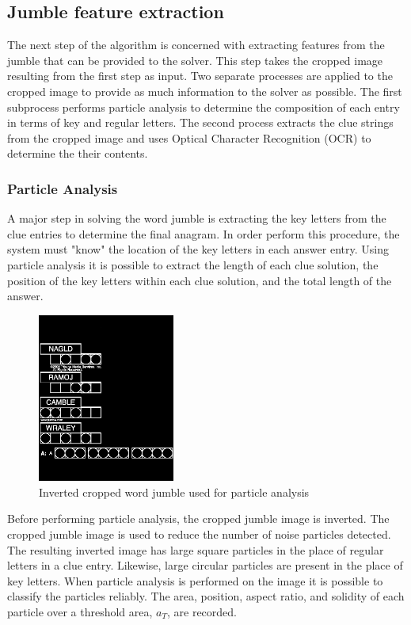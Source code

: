 \documentclass{article}
\begin{document}
	\subsection{Jumble feature extraction}
	The next step of the algorithm is concerned with extracting features from the jumble that can be provided to the solver.  This step takes the cropped image resulting from the first step as input.   Two separate processes are applied to the cropped image to provide as much information to the solver as possible.  The first subprocess performs particle analysis to determine the composition of each entry in terms of key and regular letters.  The second process extracts the clue strings from the cropped image and uses Optical Character Recognition (OCR) to determine the their contents.  
	
	\subsubsection{Particle Analysis}
	A major step in solving the word jumble is extracting the key letters from the clue entries to determine the final anagram.  In order perform this procedure, the system must "know" the location of the key letters in each answer entry.  Using particle analysis it is possible to extract the length of each clue solution, the position of the key letters within each clue solution, and the total length of the answer.  \par 
	
	\begin{figure}[h]
		\centering
		\includegraphics[width=0.4\textwidth]{j1_inverted}
		\caption{Inverted cropped word jumble used for particle analysis}
	\end{figure}


	Before performing particle analysis, the cropped jumble image is inverted. The cropped jumble image is used to reduce the number of noise particles detected.  The resulting inverted image has large square particles in the place of regular letters in a clue entry. Likewise, large circular particles are present in the place of key letters.  When particle analysis is performed on the image it is possible to classify the particles reliably. The area, position, aspect ratio, and solidity of each particle over a threshold area, $a_T$,  are recorded.
	
\end{document}
